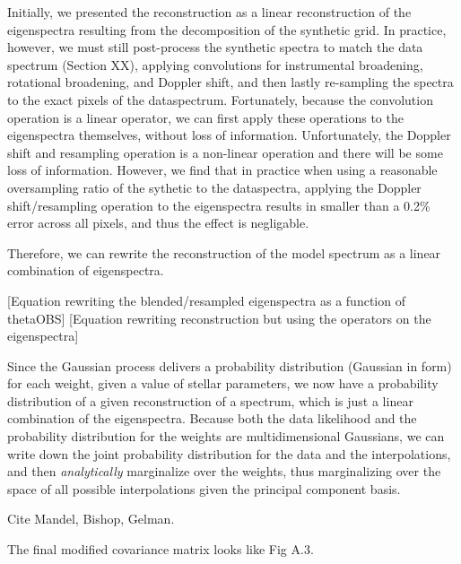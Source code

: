 \documentclass[iop,floatfix,twocolappendix]{emulateapj}
\begin{document}
Initially, we presented the reconstruction as a linear reconstruction of the eigenspectra resulting from the decomposition of the synthetic grid. In practice, however, we must still post-process the synthetic spectra to match the data spectrum (Section XX), applying convolutions for instrumental broadening, rotational broadening, and Doppler shift, and then lastly re-sampling the spectra to the exact pixels of the dataspectrum. Fortunately, because the convolution operation is a linear operator, we can first apply these operations to the eigenspectra themselves, without loss of information. Unfortunately, the Doppler shift and resampling operation is a non-linear operation and there will be some loss of information. However, we find that in practice when using a reasonable oversampling ratio of the sythetic to the dataspectra, applying the Doppler shift/resampling operation to the eigenspectra results in smaller than a 0.2\% error across all pixels, and thus the effect is negligable.

Therefore, we can rewrite the reconstruction of the model spectrum as a linear combination of eigenspectra. 

[Equation rewriting the blended/resampled eigenspectra as a function of thetaOBS]
[Equation rewriting reconstruction but using the operators on the eigenspectra]

Since the Gaussian process delivers a probability distribution (Gaussian in form) for each weight, given a value of stellar parameters, we now have a probability distribution of a given reconstruction of a spectrum, which is just a linear combination of the eigenspectra. Because both the data likelihood and the probability distribution for the weights are multidimensional Gaussians, we can write down the joint probability distribution for the data and the interpolations, and then \emph{analytically} marginalize over the weights, thus marginalizing over the space of all possible interpolations given the principal component basis.

Cite Mandel, Bishop, Gelman.

The final modified covariance matrix looks like Fig A.3.






\end{document}
